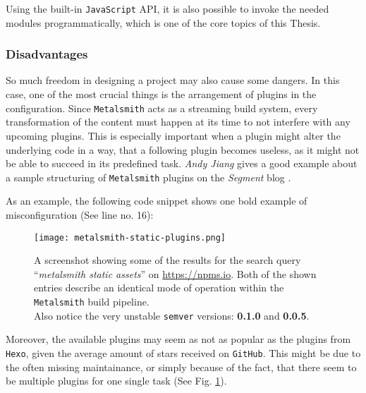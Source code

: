 Using the built-in \texttt{JavaScript} API, it is also possible to invoke the needed modules programmatically, which is one of the core topics of this Thesis.

\subsubsection{Disadvantages}
So much freedom in designing a project may also cause some dangers. In this case, one of the most crucial things is the arrangement of plugins in the configuration. Since \texttt{Metalsmith} acts as a streaming build system, every transformation of the content must happen at its time to not interfere with any upcoming plugins. This is especially important when a plugin might alter the underlying code in a way, that a following plugin becomes useless, as it might not be able to succeed in its predefined task. \emph{Andy Jiang} gives a good example about a sample structuring of \texttt{Metalsmith} plugins on the \emph{Segment} blog \cite{Metalsmith2015technicaldocumentation}.

As an example, the following code snippet shows one bold example of misconfiguration (See line no. 16):



\begin{figure}[b] %
    \centering
    \texttt{[image: metalsmith-static-plugins.png]}
    \caption{A screenshot showing some of the results for the search query ``\emph{metalsmith static assets}'' on \url{https://npms.io}. Both of the shown entries describe an identical mode of operation within the \texttt{Metalsmith} build pipeline.\\
    Also notice the very unstable \texttt{semver} versions: \textbf{0.1.0} and \textbf{0.0.5}.}
    \label{fig:metalsmith-plugins}
\end{figure}
%

Moreover, the available plugins may seem as not as popular as the plugins from \texttt{Hexo}, given the average amount of stars received on \texttt{GitHub}. This might be due to the often missing maintainance, or simply because of the fact, that there seem to be multiple plugins for one single task (See Fig. \ref{fig:metalsmith-plugins}).
